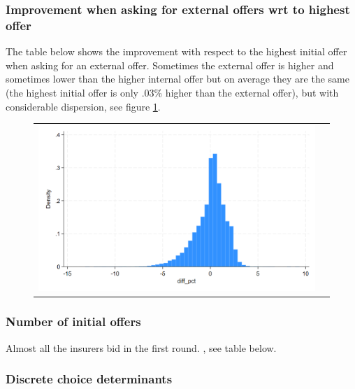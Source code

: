 \documentclass[12pt]{article}
\begin{document}




\subsubsection{Improvement when asking for external offers wrt to highest offer}

The table below shows the improvement with respect to the highest initial offer when asking for an external offer. Sometimes the external offer is higher and sometimes lower than the higher internal offer but on average they are the same (the highest initial offer is only .03\% higher than the external offer), but with considerable dispersion, see figure \ref{fig:ie3_6}. 





\begin{figure}[H]
\caption{}
\label{fig:ie3_6}
\centering{}%
\begin{tabular}{cc}
\includegraphics[scale=0.27]{figures/IE3_offer_change_max_internal.png}
\end{tabular}
\end{figure}


\subsubsection{Number of initial offers}


Almost all the insurers bid in the first round. , see table below.



\subsubsection{Discrete choice determinants}
\end{document}
